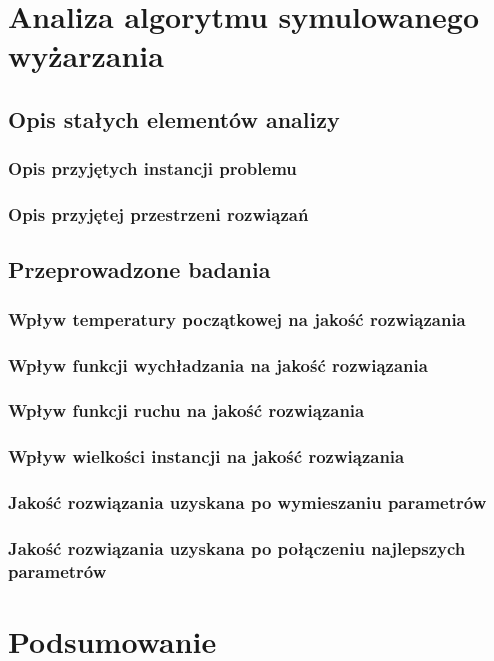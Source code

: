 
\chapter{Analiza algorytmu symulowanego wyżarzania}
\section{Opis stałych elementów analizy}
\subsection{Opis przyjętych instancji problemu}
\subsection{Opis przyjętej przestrzeni rozwiązań}
\section{Przeprowadzone badania}
\subsection{Wpływ temperatury początkowej na jakość rozwiązania}
\subsection{Wpływ funkcji wychładzania na jakość rozwiązania}
\subsection{Wpływ funkcji ruchu na jakość rozwiązania}
\subsection{Wpływ wielkości instancji na jakość rozwiązania}
\subsection{Jakość rozwiązania uzyskana po wymieszaniu parametrów}
\subsection{Jakość rozwiązania uzyskana po połączeniu najlepszych parametrów}

\chapter{Podsumowanie}
